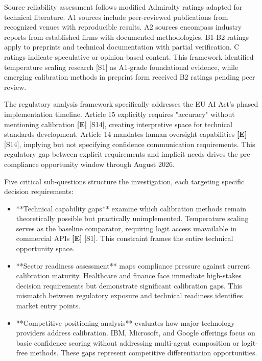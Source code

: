 \documentclass[a4paper,11pt]{article}
\newcommand{\elabel}{\textbf{\textcolor{ecolor}{[E]}}}
\begin{document}
Source reliability assessment follows modified Admiralty ratings adapted for technical literature. A1 sources include peer-reviewed publications from recognized venues with reproducible results. A2 sources encompass industry reports from established firms with documented methodologies. B1-B2 ratings apply to preprints and technical documentation with partial verification. C ratings indicate speculative or opinion-based content. This framework identified temperature scaling research \textcolor{primary}{[S1]} as A1-grade foundational evidence, while emerging calibration methods in preprint form received B2 ratings pending peer review.


The regulatory analysis framework specifically addresses the EU AI Act's phased implementation timeline. Article 15 explicitly requires "accuracy" without mentioning calibration \elabel{} \textcolor{primary}{[S14]}, creating interpretive space for technical standards development. Article 14 mandates human oversight capabilities \elabel{} \textcolor{primary}{[S14]}, implying but not specifying confidence communication requirements. This regulatory gap between explicit requirements and implicit needs drives the pre-compliance opportunity window through August 2026.


Five critical sub-questions structure the investigation, each targeting specific decision requirements:


\begin{itemize}
  \item **Technical capability gaps** examine which calibration methods remain theoretically possible but practically unimplemented. Temperature scaling serves as the baseline comparator, requiring logit access unavailable in commercial APIs \elabel{} \textcolor{primary}{[S1]}. This constraint frames the entire technical opportunity space.
\end{itemize}

\begin{itemize}
  \item **Sector readiness assessment** maps compliance pressure against current calibration maturity. Healthcare and finance face immediate high-stakes decision requirements but demonstrate significant calibration gaps. This mismatch between regulatory exposure and technical readiness identifies market entry points.
\end{itemize}

\begin{itemize}
  \item **Competitive positioning analysis** evaluates how major technology providers address calibration. IBM, Microsoft, and Google offerings focus on basic confidence scoring without addressing multi-agent composition or logit-free methods. These gaps represent competitive differentiation opportunities.
\end{itemize}
\end{document}
